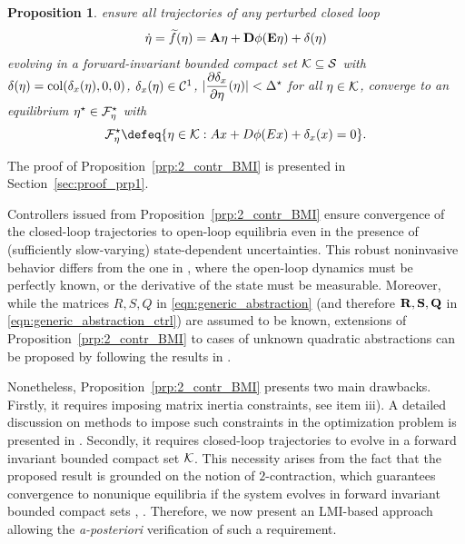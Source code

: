 \documentclass{ifacconf}
\newtheorem{proposition}{Proposition}
\begin{document}
\begin{proposition}
    ensure all trajectories of any perturbed closed loop
\begin{equation}
\begin{array}{rl}
        \label{eqn:nonlin_sys_closed_loop_pert}
        \dot \eta= \widetilde f(\eta) ={\bf{A}} \eta + {\bf{D}}\phi({\bf{E}}\eta)+ \delta(\eta)
    \end{array}
\end{equation} 
evolving in a forward-invariant bounded compact set ${\mathcal{K}}\subseteq{\mathcal{S}}$ with  $\delta(\eta)=\operatorname{col}(\delta_x(\eta),0,0)$,  $\delta_x(\eta)\in {\mathcal{C}}^1$, $|\dfrac{\partial \delta_x}{\partial \eta}(\eta)|<\Delta^\star$  for all $\eta \in {\mathcal{K}}$,
converge to an equilibrium $\eta^\star\in {\mathcal{F}}^\star_\eta$ with
    \begin{equation}
        \label{eqn:closed_loop_eq_set}
        \cF^\star_\eta \defeq \{\eta\in\cK: Ax+D\phi(E x) + \delta_x(x)= 0\}.
    \end{equation}
\end{proposition}
The proof of Proposition~\ref{prp:2_contr_BMI} is presented in Section~\ref{sec:proof_prp1}.

Controllers issued from Proposition~\ref{prp:2_contr_BMI} ensure convergence of the closed-loop trajectories to open-loop equilibria  even in the presence of (sufficiently slow-varying) state-dependent uncertainties. This robust noninvasive behavior differs from the one in \citep{ANGELI2024152}, where the open-loop dynamics must be perfectly known, or the derivative of the state must be measurable.  Moreover, while the matrices $R,S,Q$ in \eqref{eqn:generic_abstraction} (and therefore ${\bf{R}},{\bf{S}},{\bf{Q}}$ in \eqref{eqn:generic_abstraction_ctrl}) are assumed to be known, extensions of Proposition~\ref{prp:2_contr_BMI} to cases of unknown quadratic abstractions can be proposed by following the results in \citep[Section 2]{zoboli2024dynamic}. 

Nonetheless, Proposition~\ref{prp:2_contr_BMI} presents two main drawbacks. Firstly, it requires imposing matrix inertia constraints, see item iii). A detailed discussion on methods to impose such constraints in the optimization problem is presented in \citep[Section 3]{zoboli2024dynamic}. Secondly, it requires closed-loop trajectories to evolve in a forward invariant bounded compact set ${\mathcal{K}}$. This necessity arises from the fact that the proposed result is grounded on the notion of $2$-contraction, which guarantees convergence to nonunique equilibria if the system evolves in forward invariant bounded compact sets \citep[Theorem 2.5]{Michael1995}, \citep[Lemma 6]{cecilia2023generalized}. Therefore, we now present an LMI-based approach allowing the \textit{a-posteriori} verification of such a requirement.
\end{document}
